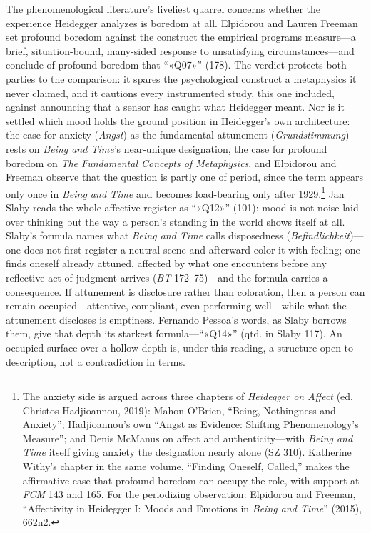 The phenomenological literature's liveliest quarrel concerns whether the experience Heidegger
analyzes is boredom at all. Elpidorou and Lauren Freeman set profound boredom against the
construct the empirical programs measure---a brief, situation-bound, many-sided response to
unsatisfying circumstances---and conclude of profound boredom that ``«Q07»'' (178). The
verdict protects both parties to the comparison: it spares the psychological construct a
metaphysics it never claimed, and it cautions every instrumented study, this one included,
against announcing that a sensor has caught what Heidegger meant. Nor is it settled which
mood holds the ground position in Heidegger's own architecture: the case for anxiety
(\textit{Angst}) as the fundamental attunement (\textit{Grundstimmung}) rests on
\textit{Being and Time}'s near-unique designation, the case for profound boredom on
\textit{The Fundamental Concepts of Metaphysics}, and Elpidorou and Freeman observe that the
question is partly one of period, since the term appears only once in \textit{Being and Time}
and becomes load-bearing only after 1929.\footnote{The anxiety side is argued across three
chapters of \textit{Heidegger on Affect} (ed. Christos Hadjioannou, 2019): Mahon O'Brien,
``Being, Nothingness and Anxiety''; Hadjioannou's own ``Angst as Evidence: Shifting
Phenomenology's Measure''; and Denis McManus on affect and authenticity---with \textit{Being and Time}
itself giving anxiety the designation nearly alone (SZ 310). Katherine Withy's chapter in the
same volume, ``Finding Oneself, Called,'' makes the affirmative case that profound boredom
can occupy the role, with support at \textit{FCM} 143 and 165. For the periodizing
observation: Elpidorou and Freeman, ``Affectivity in Heidegger I: Moods and Emotions in
\textit{Being and Time}'' (2015), 662n2.} Jan Slaby reads the whole affective register as
``«Q12»'' (101): mood is not noise laid over thinking but the way a person's standing in the
world shows itself at all. Slaby's formula names what \textit{Being and Time} calls
disposedness (\textit{Befindlichkeit})---one does not first register a neutral scene and
afterward color it with feeling; one finds oneself already attuned, affected by what one
encounters before any reflective act of judgment arrives (\textit{BT} 172--75)---and the
formula carries a consequence. If attunement is disclosure rather than coloration, then a
person can remain occupied---attentive, compliant, even performing well---while what the
attunement discloses is emptiness. Fernando Pessoa's words, as Slaby borrows them, give that
depth its starkest formula---``«Q14»'' (qtd. in Slaby 117). An occupied surface over a hollow
depth is, under this reading, a structure open to description, not a contradiction in terms.

